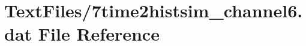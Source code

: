 \hypertarget{7time2histsim__channel6_8dat}{}\section{Text\+Files/7time2histsim\+\_\+channel6.dat File Reference}
\label{7time2histsim__channel6_8dat}
